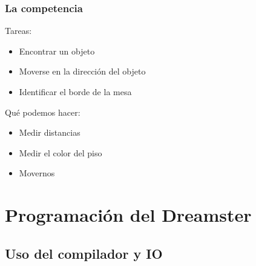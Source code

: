 \documentclass[compress]{beamer}
\begin{document}
\begin{frame}
 \frametitle{La competencia}
Tareas:
\begin{itemize}
 \item Encontrar un objeto
 \item Moverse en la dirección del objeto
 \item Identificar el borde de la mesa
\end{itemize}
Qué podemos hacer:
\begin{itemize}
 \item Medir distancias
 \item Medir el color del piso
 \item Movernos
\end{itemize}
 \end{frame}


\section{Programación del Dreamster}
\subsection{Uso del compilador y IO}
\end{document}
